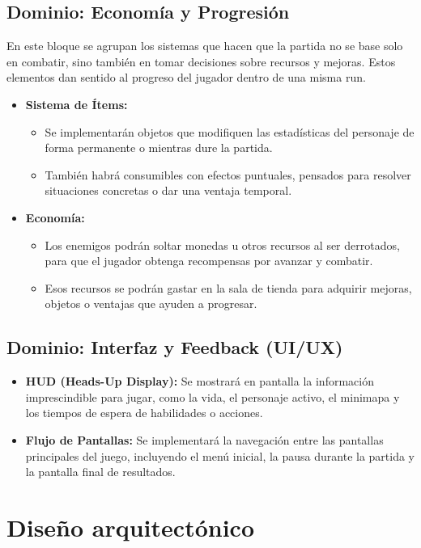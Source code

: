\subsection{Dominio: Economía y Progresión}
En este bloque se agrupan los sistemas que hacen que la partida no se base solo en combatir, 
sino también en tomar decisiones sobre recursos y mejoras. Estos elementos dan sentido al 
progreso del jugador dentro de una misma run.
\begin{itemize}
    \item \textbf{Sistema de Ítems:}
    \begin{itemize}
        \item Se implementarán objetos que modifiquen las estadísticas del personaje de forma 
        permanente o mientras dure la partida.
        \item También habrá consumibles con efectos puntuales, pensados para resolver situaciones 
        concretas o dar una ventaja temporal.
    \end{itemize}
    \item \textbf{Economía:}
    \begin{itemize}
        \item Los enemigos podrán soltar monedas u otros recursos al ser derrotados, para que el 
        jugador obtenga recompensas por avanzar y combatir.
        \item Esos recursos se podrán gastar en la sala de tienda para adquirir mejoras, objetos 
        o ventajas que ayuden a progresar.
    \end{itemize}
\end{itemize}

\subsection{Dominio: Interfaz y Feedback (UI/UX)}
\begin{itemize}
    \item \textbf{HUD (Heads-Up Display):} Se mostrará en pantalla la información 
    imprescindible para jugar, como la vida, el personaje activo, el minimapa y los tiempos 
    de espera de habilidades o acciones.
    \item \textbf{Flujo de Pantallas:} Se implementará la navegación entre las pantallas 
    principales del juego, incluyendo el menú inicial, la pausa durante la partida y la 
    pantalla final de resultados.
\end{itemize}

\section{Diseño arquitectónico}

